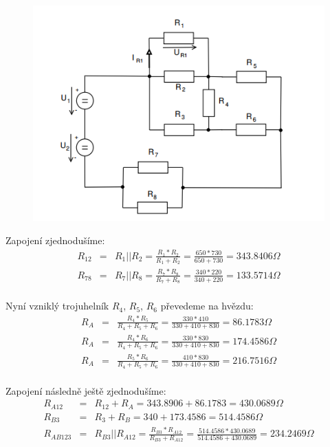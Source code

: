 \documentclass[a4paper,oneside,13pt]{article}
\begin{document}
	\begin{figure}[h]
		\begin{center}
			\includegraphics[width=14cm,keepaspectratio]{Odpory_1.PNG}
		\end{center}
	\end{figure}

	Zapojení zjednodušíme:
	\begin{eqnarray*}
		R_{12} & = & R_{1} || R_{2} = \frac{R_{1} *  R_{2}}{R_{1} +  R_{2}} = \frac{650*730}{650+730} = 343.8406 \Omega \\
		R_{78} & = & R_{7} || R_{8} = \frac{R_{7} *  R_{8}}{R_{7} +  R_{8}} = \frac{340*220}{340+220} = 133.5714 \Omega \\
	\end{eqnarray*}

	Nyní vzniklý trojuhelník $R_{4}$,  $R_{5}$,  $R_{6}$ převedeme na hvězdu:
	\begin{eqnarray*}
		R_{A} & = & \frac{R_{4} *  R_{5}}{R_{4} + R_{5} + R_{6}} = \frac{330 * 410}{330 + 410 + 830} = 86.1783 \Omega \\
		R_{A} & = & \frac{R_{4} *  R_{6}}{R_{4} + R_{5} + R_{6}} = \frac{330 * 830}{330 + 410 + 830} = 174.4586 \Omega \\
		R_{A} & = & \frac{R_{5} *  R_{6}}{R_{4} + R_{5} + R_{6}} = \frac{410 * 830}{330 + 410 + 830} = 216.7516 \Omega \\
	\end{eqnarray*}

	Zapojení následně ještě zjednodušíme:
	\begin{eqnarray*}
		R_{A12} & = & R_{12} + R_{A} = 343.8906 + 86.1783 = 430.0689 \Omega \\
		R_{B3} & = & R_{3} + R_{B} = 340 + 173.4586 = 514.4586 \Omega \\
		R_{AB123} & = & R_{B3} || R_{A12} = \frac{R_{B3} * R_{A12}}{R_{B3} +R_{A12}} = \frac{514.4586 * 430.0689}{514.4586 + 430.0689} = 234.2469 \Omega \\
	\end{eqnarray*}
\end{document}
